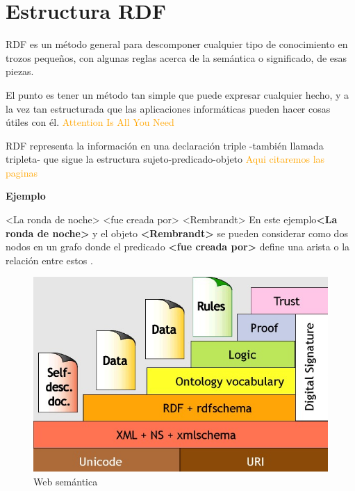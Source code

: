 \documentclass[conference]{IEEEtran}
\begin{document}
\section{Estructura RDF}
RDF es un método general para descomponer cualquier tipo de conocimiento en trozos pequeños, con algunas reglas acerca de la semántica o significado, de esas piezas.

El punto es tener un método tan simple que puede expresar cualquier hecho, y a la vez tan estructurada que las aplicaciones informáticas pueden hacer cosas útiles con él. \textcolor{orange}{Attention Is All You Need} \cite{b1}

RDF representa la información en una declaración triple -también llamada tripleta- que sigue la estructura sujeto-predicado-objeto \textcolor{orange}{Aqui citaremos las paginas} \cite{b1}

\vspace{0.2cm}
\textbf{Ejemplo}

<La ronda de noche> <fue creada por> <Rembrandt>
\vspace{0.2cm}
En este ejemplo\textbf{<La ronda de noche>} y el objeto \textbf{<Rembrandt>} se pueden considerar como dos nodos en un grafo donde el predicado \textbf{<fue creada por>} define una arista o la relación entre estos .

\vspace{0.2cm}

\begin{figure}[h]
    \centering
	\includegraphics[scale=0.40]{imagenes/imagen1.jpeg} 
	\caption{Web semántica \cite{b7}}
\end{figure}

\vspace{0.2cm}
\end{document}
